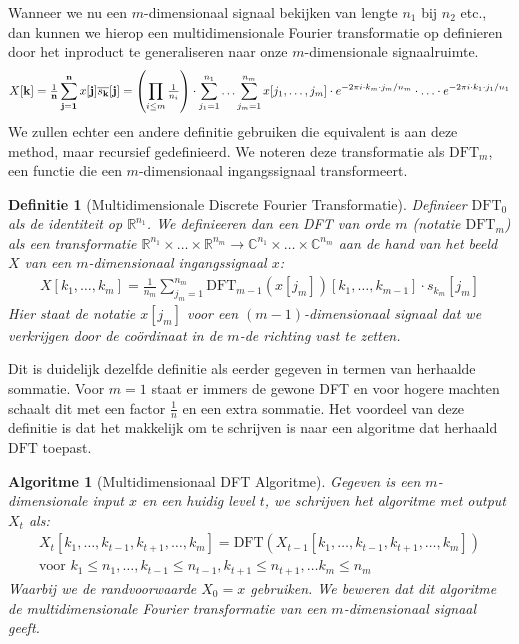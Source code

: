 \documentclass[11pt]{report}
\newcommand{\R}{\mathbb{R}}
\newcommand{\C}{\mathbb{C}}
\newtheorem*{algo}{Algoritme}
\newtheorem*{definitie}{Definitie}
\theoremstyle{remark}
\newcommand{\eq}[1]{\begin{eqnarray*} #1 \end{eqnarray*}}
\newcommand{\DFT}{\text{DFT}}
\newcommand{\dpii}{{2\pi i}}
\begin{document}
Wanneer we nu een $m$-dimensionaal signaal bekijken van lengte $n_1$ bij $n_2$ etc., dan kunnen we
hierop een multidimensionale Fourier transformatie op definieren door het inproduct te generaliseren naar 
onze $m$-dimensionale signaalruimte.
\eq{
  X[\bold k] = \tfrac{1}{\bold n}\sum_{\bold j = \bold 1}^{\bold n} x[\bold j] \overline{s_{\bold k}}[{\bold j}] =
  \left(\prod_{i\leq m} \tfrac{1}{n_i}\right) \cdot \sum_{j_1=1}^{n_1} \ldots \sum_{j_m=1}^{n_m} x[j_1,\ldots,j_m] \cdot 
  e^{-\dpii\cdot k_m \cdot j_m /n_m } \cdot \ldots \cdot e^{-\dpii\cdot k_1 \cdot j_1 /n_1 } 
}
We zullen echter een andere definitie gebruiken die equivalent is aan deze method, maar recursief gedefinieerd.
We noteren deze transformatie als $\DFT_m$, een functie die een $m$-dimensionaal ingangssignaal transformeert.
\begin{definitie}[Multidimensionale Discrete Fourier Transformatie]
Definieer $\DFT_0$ als de identiteit op $\R^{n_1}$.
We definieeren dan een DFT van orde $m$ (notatie $\DFT_m$) als een transformatie 
$\R^{n_1}\times\ldots\times\R^{n_m} \to \C^{n_1}\times\ldots\times\C^{n_m}$ aan de hand van het beeld $X$ van een $m$-dimensionaal ingangssignaal $x$:
\eq{
  X[k_1,\ldots,k_m] = \tfrac{1}{n_m}\sum_{j_m=1}^{n_m} \DFT_{m-1}(x[j_m])[k_1,\ldots,k_{m-1}] \cdot s_{k_m}[j_m]  
}
Hier staat de notatie $x[j_m]$ voor een $(m-1)$-dimensionaal signaal dat we verkrijgen door de co\"ordinaat
in de $m$-de richting vast te zetten.
\end{definitie}
Dit is duidelijk dezelfde definitie als eerder gegeven in termen van herhaalde sommatie. Voor $m=1$ staat er immers de gewone DFT en voor hogere machten schaalt dit met een factor $\tfrac{1}{n}$ en een extra sommatie.
Het voordeel van deze definitie is dat het makkelijk om te schrijven is naar een algoritme dat 
herhaald $\DFT$ toepast.
\begin{algo}[Multidimensionaal DFT Algoritme]
Gegeven is een $m$-dimensionale input $x$ en een huidig level $t$, 
we schrijven het algoritme met output $X_t$ als:
\eq{
  X_{t}[k_1,\ldots,k_{t-1},k_{t+1},\ldots,k_m] = \DFT(X_{t-1}[k_1,\ldots,k_{t-1},k_{t+1},\ldots,k_m]) \\
  \text{voor } k_1\leq n_1, \ldots ,k_{t-1}\leq n_{t-1}, k_{t+1}\leq n_{t+1}, \ldots k_m \leq n_m
}
Waarbij we de randvoorwaarde $X_0 = x$ gebruiken. We beweren dat dit algoritme de multidimensionale Fourier transformatie van een $m$-dimensionaal signaal geeft.
\end{algo}
\end{document}
